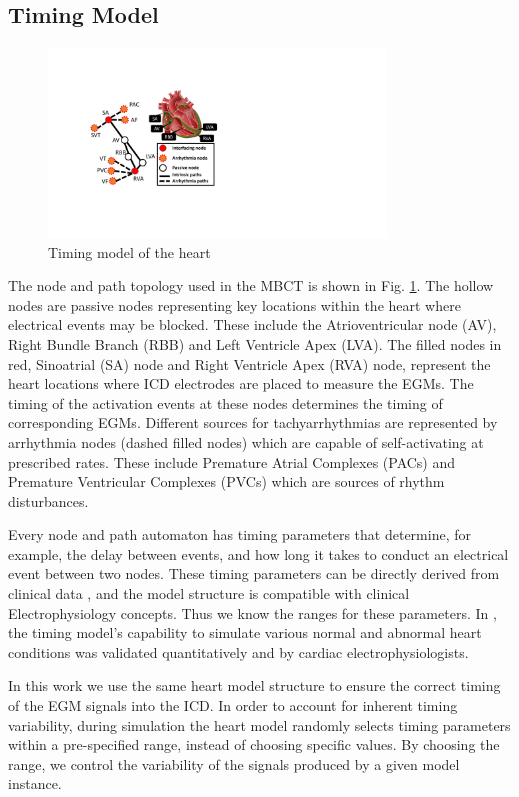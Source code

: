 \subsection{Timing Model}
\begin{figure}[t]
	\centering
	\includegraphics[width=0.8\textwidth]{figs/HM_top.pdf}
	\caption{\small Timing model of the heart}
	\label{fig:HM_top}
\end{figure}

The node and path topology used in the MBCT is shown in Fig. \ref{fig:HM_top}. 
The hollow nodes are passive nodes representing key locations within the heart where electrical events may be blocked. These include the Atrioventricular node (AV), Right Bundle Branch (RBB) and Left Ventricle Apex (LVA). 
The filled nodes in red, Sinoatrial (SA) node and Right Ventricle Apex (RVA) node, represent the heart locations where ICD electrodes are placed to measure the EGMs.
The timing of the activation events at these nodes determines the timing of corresponding EGMs.
Different sources for tachyarrhythmias are represented by arrhythmia nodes (dashed filled nodes) which are capable of self-activating at prescribed rates. These include Premature Atrial Complexes (PACs) and Premature Ventricular Complexes (PVCs) which are sources of rhythm disturbances.

Every node and path automaton has timing parameters that determine, for example, the delay between events, and how long it takes to conduct an electrical event between two nodes.
These timing parameters can be directly derived from clinical data \cite{josephson}, and the model structure is compatible with clinical Electrophysiology concepts.
Thus we know the ranges for these parameters.
In \cite{VHM_proc}, the timing model's capability to simulate various normal and abnormal heart conditions was validated quantitatively and by cardiac electrophysiologists.


In this work we use the same heart model structure to ensure the correct timing of the EGM signals into the ICD.
In order to account for inherent timing variability, during simulation the heart model randomly selects timing parameters within a pre-specified range, instead of choosing specific values. 
By choosing the range, we control the variability of the signals produced by a given model instance.

